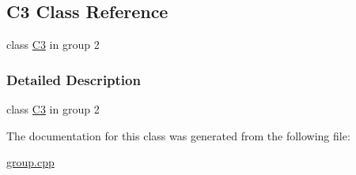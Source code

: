 \hypertarget{class_c3}{}\subsection{C3 Class Reference}
\label{class_c3}


class \mbox{\hyperlink{class_c3}{C3}} in group 2  




\subsubsection{Detailed Description}
class \mbox{\hyperlink{class_c3}{C3}} in group 2 

The documentation for this class was generated from the following file\+:\begin{DoxyCompactItemize}
\item 
\mbox{\hyperlink{group_8cpp}{group.\+cpp}}\end{DoxyCompactItemize}
